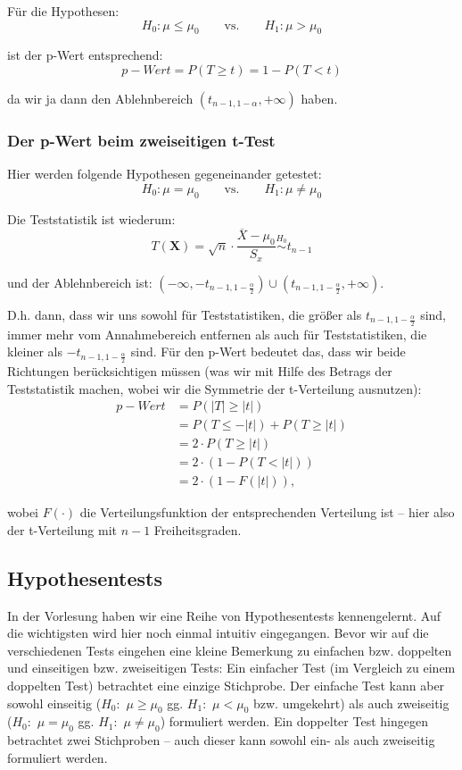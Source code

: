 \documentclass[a4paper]{article}
\newcommand{\simtext}[1]{\ensuremath{\stackrel{\text{#1}}{\sim}}}
\newcommand\dangersign[1][2ex]{%
  \renewcommand\stacktype{L}%
  \scaleto{\stackon[1.3pt]{\color{red}$\triangle$}{\tiny !}}{#1}%
}
\begin{document}
\noindent \dangersign[3ex] Für die Hypothesen: 
$$H_0: \mu \leq \mu_0 \qquad \mbox{vs.} \qquad H_1: \mu > \mu_0$$

\noindent ist der p-Wert entsprechend:
$$p-Wert=P(T \geq t)=1-P(T < t)$$

\noindent da wir ja dann den Ablehnbereich $(t_{n-1,1-\alpha}, + \infty)$ haben.

\subsubsection{Der p-Wert beim zweiseitigen t-Test}\label{sec:pWert2}

Hier werden folgende Hypothesen gegeneinander getestet:
$$H_0: \mu = \mu_0 \qquad \mbox{vs.} \qquad H_1: \mu \neq \mu_0$$

\noindent Die Teststatistik ist wiederum:
$$T(\textbf{X})=\sqrt{n}\cdot\frac{\overline{X}-\mu_0}{S_x} \simtext{$H_0$} t_{n-1}$$

\noindent und der Ablehnbereich ist: $(-\infty, -t_{n-1,1-\frac{\alpha}{2}}) \cup (t_{n-1,1-\frac{\alpha}{2}}, +\infty)$.

\noindent D.h. dann, dass wir uns sowohl für Teststatistiken, die größer als $t_{n-1,1-\frac{\alpha}{2}}$ sind, immer mehr vom Annahmebereich entfernen als auch für Teststatistiken, die kleiner als $-t_{n-1,1-\frac{\alpha}{2}}$ sind. Für den p-Wert bedeutet das, dass wir beide Richtungen berücksichtigen müssen (was wir mit Hilfe des Betrags der Teststatistik machen, wobei wir die Symmetrie der t-Verteilung ausnutzen):
\begin{align*} 
p-Wert &= P(|T| \geq |t|)  \\
	&=	P(T \leq -|t|) + P(T \geq |t|)			\\
	&=	2 \cdot P(T \geq |t|)			\\
	&=	2 \cdot (1-P(T < |t|))			\\
	&=	2 \cdot (1-F(|t|)),		
\end{align*} 

\noindent wobei $F(\cdot)$ die Verteilungsfunktion der entsprechenden Verteilung ist -- hier also der t-Verteilung mit $n-1$ Freiheitsgraden.


\subsection{Hypothesentests}\label{sec:HypTests}

In der Vorlesung haben wir eine Reihe von Hypothesentests kennengelernt. Auf die wichtigsten wird hier noch einmal intuitiv eingegangen. Bevor wir auf die verschiedenen Tests eingehen eine kleine Bemerkung zu einfachen bzw. doppelten und einseitigen bzw. zweiseitigen Tests:
Ein einfacher Test (im Vergleich zu einem doppelten Test) betrachtet eine einzige Stichprobe. Der einfache Test kann aber sowohl einseitig ($H_0:$ $\mu \geq \mu_0$ gg. $H_1:$ $\mu < \mu_0$ bzw. umgekehrt) als auch zweiseitig ($H_0:$ $\mu = \mu_0$ gg. $H_1:$ $\mu \neq \mu_0$) formuliert werden. Ein doppelter Test hingegen betrachtet zwei Stichproben -- auch dieser kann sowohl ein- als auch zweiseitig formuliert werden.
\end{document}
